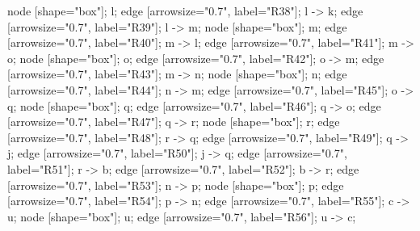 \begin{pythonaienv}
{node [shape="box"]; l; 
edge [arrowsize="0.7", label="R38"]; l -> k; 
edge [arrowsize="0.7", label="R39"]; l -> m; 
node [shape="box"]; m; 
edge [arrowsize="0.7", label="R40"]; m -> l; 
edge [arrowsize="0.7", label="R41"]; m -> o; 
node [shape="box"]; o; 
edge [arrowsize="0.7", label="R42"]; o -> m; 
edge [arrowsize="0.7", label="R43"]; m -> n; 
node [shape="box"]; n; 
edge [arrowsize="0.7", label="R44"]; n -> m; 
edge [arrowsize="0.7", label="R45"]; o -> q; 
node [shape="box"]; q; 
edge [arrowsize="0.7", label="R46"]; q -> o; 
edge [arrowsize="0.7", label="R47"]; q -> r; 
node [shape="box"]; r; 
edge [arrowsize="0.7", label="R48"]; r -> q; 
edge [arrowsize="0.7", label="R49"]; q -> j; 
edge [arrowsize="0.7", label="R50"]; j -> q; 
edge [arrowsize="0.7", label="R51"]; r -> b; 
edge [arrowsize="0.7", label="R52"]; b -> r; 
edge [arrowsize="0.7", label="R53"]; n -> p; 
node [shape="box"]; p; 
edge [arrowsize="0.7", label="R54"]; p -> n; 
edge [arrowsize="0.7", label="R55"]; c -> u; 
node [shape="box"]; u; 
edge [arrowsize="0.7", label="R56"]; u -> c; 
}

\end{pythonaienv}
